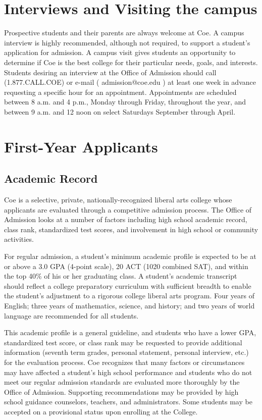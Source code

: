 \documentclass[
  letterpaper,
]{scrbook}
\begin{document}
\section{Interviews and Visiting the
campus}\label{interviews-and-visiting-the-campus}

Prospective students and their parents are always welcome at Coe. A
campus interview is highly recommended, although not required, to
support a student's application for admission. A campus visit gives
students an opportunity to determine if Coe is the best college for
their particular needs, goals, and interests. Students desiring an
interview at the Office of Admission should call (1.877.CALL.COE) or
e-mail ( {admission@coe.edu} ) at least one week in advance requesting a
specific hour for an appointment. Appointments are scheduled between 8
a.m. and 4 p.m., Monday through Friday, throughout the year, and between
9 a.m. and 12 noon on select Saturdays September through April.

\section{First-Year Applicants}\label{first-year-applicants}

\subsection{Academic Record}\label{academic-record}

Coe is a selective, private, nationally-recognized liberal arts college
whose applicants are evaluated through a competitive admission process.
The Office of Admission looks at a number of factors including high
school academic record, class rank, standardized test scores, and
involvement in high school or community activities.

For regular admission, a student's minimum academic profile is expected
to be at or above a 3.0 GPA (4-point scale), 20 ACT (1020 combined SAT),
and within the top 40\% of his or her graduating class. A student's
academic transcript should reflect a college preparatory curriculum with
sufficient breadth to enable the student's adjustment to a rigorous
college liberal arts program. Four years of English; three years of
mathematics, science, and history; and two years of world language are
recommended for all students.

This academic profile is a general guideline, and students who have a
lower GPA, standardized test score, or class rank may be requested to
provide additional information (seventh term grades, personal statement,
personal interview, etc.) for the evaluation process. Coe recognizes
that many factors or circumstances may have affected a student's high
school performance and students who do not meet our regular admission
standards are evaluated more thoroughly by the Office of Admission.
Supporting recommendations may be provided by high school guidance
counselors, teachers, and administrators. Some students may be accepted
on a provisional status upon enrolling at the College.
\end{document}
